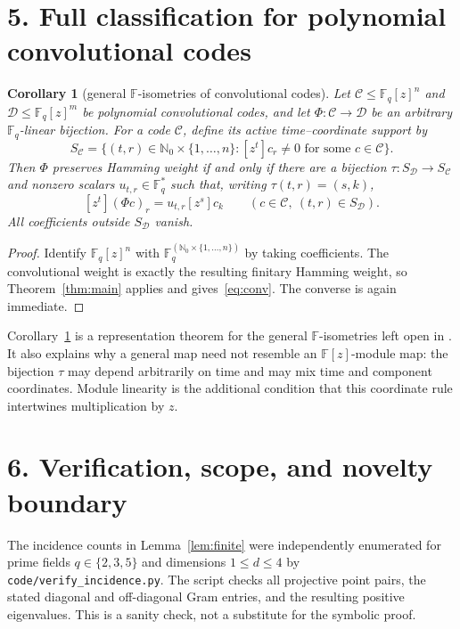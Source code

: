 \documentclass[11pt]{article}
\newtheorem{corollary}[theorem]{Corollary}
\newcommand{\F}{\mathbb F}
\begin{document}
\section*{5. Full classification for polynomial convolutional codes}

\begin{corollary}[general $\F$-isometries of convolutional codes]
\label{cor:conv}
Let $\mathcal C\leq\F_q[z]^n$ and
$\mathcal D\leq\F_q[z]^m$ be polynomial convolutional codes, and let
$\Phi:\mathcal C\to\mathcal D$ be an arbitrary $\F_q$-linear bijection.
For a code $\mathcal C$, define its active time--coordinate support by
\[
 S_{\mathcal C}=\{(t,r)\in\mathbb N_0\times\{1,\dots,n\}:
 [z^t]c_r\ne0\text{ for some }c\in\mathcal C\}.
\]
Then $\Phi$ preserves Hamming weight if and only if there are a bijection
$\tau:S_{\mathcal D}\to S_{\mathcal C}$ and nonzero scalars
$u_{t,r}\in\F_q^*$ such that, writing $\tau(t,r)=(s,k)$,
\begin{equation}\label{eq:conv}
 [z^t](\Phi c)_r=u_{t,r}[z^s]c_k
 \qquad(c\in\mathcal C,\ (t,r)\in S_{\mathcal D}).
\end{equation}
All coefficients outside $S_{\mathcal D}$ vanish.
\end{corollary}

\begin{proof}
Identify $\F_q[z]^n$ with
$\F_q^{(\mathbb N_0\times\{1,\dots,n\})}$ by taking coefficients.  The
convolutional weight is exactly the resulting finitary Hamming weight, so
Theorem~\ref{thm:main} applies and gives~\eqref{eq:conv}.  The converse is
again immediate.
\end{proof}

Corollary~\ref{cor:conv} is a representation theorem for the general
$\F$-isometries left open in \cite{FGH,GL}.  It also explains why a general
map need not resemble an $\F[z]$-module map: the bijection $\tau$ may depend
arbitrarily on time and may mix time and component coordinates.  Module
linearity is the additional condition that this coordinate rule intertwines
multiplication by $z$.

\section*{6. Verification, scope, and novelty boundary}

The incidence counts in Lemma~\ref{lem:finite} were independently enumerated
for prime fields $q\in\{2,3,5\}$ and dimensions $1\leq d\leq4$ by
\texttt{code/verify\_incidence.py}.  The script checks all projective point
pairs, the stated diagonal and off-diagonal Gram entries, and the resulting
positive eigenvalues.  This is a sanity check, not a substitute for the
symbolic proof.
\end{document}
